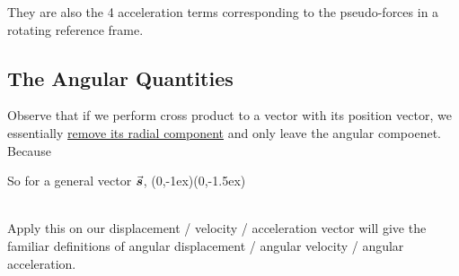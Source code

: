 \documentclass[class=article, crop=false, 12pt]{standalone}
\begin{document}
They are also the 4 acceleration terms corresponding to the pseudo-forces in a rotating reference frame. 



\subsection{The Angular Quantities}

Observe that if we perform cross product to a vector with its position vector, 
we essentially \ul{remove its radial component} and only leave the angular compoenet. Because


So for a general vector $\va*{s}$,
{(0,-1ex)}{(0,-1.5ex)}

\hfill\\[1em]
Apply this on our displacement / velocity / acceleration vector will give the familiar definitions of 
angular displacement / angular velocity / angular acceleration.
\end{document}
